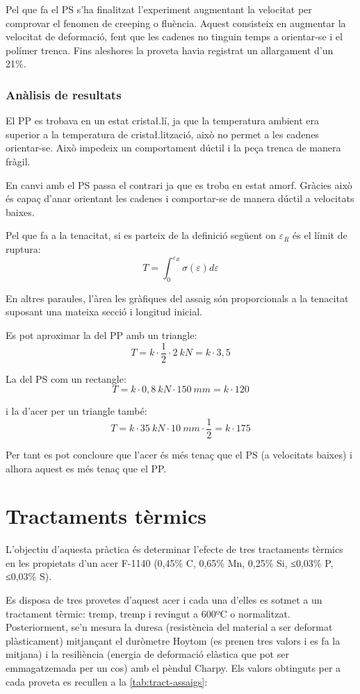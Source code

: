 \documentclass[a4paper]{report}
\begin{document}
Pel que fa el PS s'ha finalitzat l’experiment augmentant la velocitat per comprovar el fenomen de creeping o fluència. Aquest consisteix en augmentar la velocitat de deformació, fent que les cadenes no tinguin temps a orientar-se i el polímer trenca. Fins aleshores la proveta havia registrat un allargament d’un 21\%.

\subsection{Anàlisis de resultats}
El PP es trobava en un estat crista\l.lí,  ja que la temperatura ambient era superior a la temperatura de crista\l.lització, això no permet a les cadenes orientar-se. Això impedeix un comportament dúctil i la peça trenca de manera fràgil.

En canvi amb el PS passa el contrari ja que es troba en estat amorf. Gràcies això és capaç d’anar orientant les cadenes i comportar-se de manera dúctil a velocitats baixes.

Pel que fa a la tenacitat, si es parteix de la definició següent on $\varepsilon_R$ és el límit de ruptura:
$$
T = \int_0^{\varepsilon_R} \sigma(\varepsilon) d\varepsilon
$$

En altres paraules, l’àrea les gràfiques del assaig són proporcionals a la tenacitat suposant una mateixa secció i longitud inicial.

Es pot aproximar la del PP amb un triangle:
$$
T = k \cdot \frac{1}{2} \cdot 2\ kN = k \cdot 3,5
$$ 

La del PS com un rectangle:
$$
T = k \cdot 0,8\ kN \cdot 150\ mm = k \cdot 120
$$

i la d’acer per un triangle també:
$$
T = k \cdot 35\ kN \cdot 10\ mm \cdot \frac{1}{2} = k \cdot 175
$$

Per tant es pot concloure que l’acer és més tenaç que el PS (a velocitats baixes) i alhora aquest es més tenaç que el PP.

\chapter{Tractaments tèrmics}

L'objectiu d'aquesta pràctica és determinar l'efecte de tres tractaments tèrmics en les propietats d'un acer F-1140 (0,45\% C, 0,65\% Mn, 0,25\% Si, ≤0,03\% P, ≤0,03\% S). 

Es disposa de tres provetes d'aquest acer i cada una d'elles es sotmet a un tractament tèrmic: tremp, tremp i revingut a 600ºC o normalitzat. Posteriorment, se'n mesura la duresa (resistència del material a ser deformat plàsticament) mitjançant el duròmetre Hoytom (es prenen tres valors i es fa la mitjana) i la resiliència (energia de deformació elàstica que pot ser emmagatzemada per un cos) amb el pèndul Charpy. Els valors obtinguts per a cada proveta es recullen a la \autoref{tab:tract-assaigs}:
\end{document}
